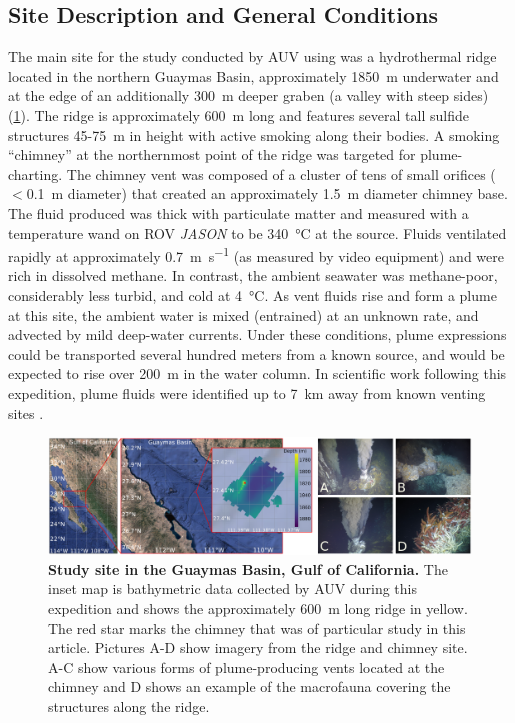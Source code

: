 \subsection{Site Description and General Conditions}
The main site for the study conducted by AUV \Sentry using \PHORTEX was a hydrothermal ridge located in the northern Guaymas Basin, approximately \SI{1850}{\meter} underwater and at the edge of an additionally \SI{300}{\meter} deeper graben (a valley with steep sides) (\cref{fig:site}). The ridge is approximately \SI{600}{\meter} long and features several tall sulfide structures 45-\SI{75}{\meter} in height with active smoking along their bodies. A smoking ``chimney'' at the northernmost point of the ridge was targeted for plume-charting. The chimney vent was composed of a cluster of tens of small orifices ($<$\SI{0.1}{\meter} diameter) that created an approximately \SI{1.5}{\meter} diameter chimney base. The fluid produced was thick with particulate matter and measured with a temperature wand on ROV \emph{JASON} to be \SI{340}{\celsius} at the source. Fluids ventilated rapidly at approximately \SI{0.7}{\meter\per\second} (as measured by video equipment) and were rich in dissolved methane. In contrast, the ambient seawater was methane-poor, considerably less turbid, and cold at \SI{4}{\celsius}. As vent fluids rise and form a plume at this site, the ambient water is mixed (entrained) at an unknown rate, and advected by mild deep-water currents. Under these conditions, plume expressions could be transported several hundred meters from a known source, and would be expected to rise over \SI{200}{\meter} in the water column. In scientific work following this expedition, plume fluids were identified up to \SI{7}{\kilo\meter} away from known venting sites \autocite{preston2022discovering}. 

\begin{figure}[h!]
    \centering
    \includegraphics[width=\columnwidth]{figures/site_summary.png}
    \caption{\textbf{Study site in the Guaymas Basin, Gulf of California.} The inset map is bathymetric data collected by AUV \Sentry during this expedition and shows the approximately \SI{600}{\meter} long ridge in yellow. The red star marks the chimney that was of particular study in this article. Pictures A-D show imagery from the ridge and chimney site. A-C show various forms of plume-producing vents located at the chimney and D shows an example of the macrofauna covering the structures along the ridge.}
    \label{fig:site}
\end{figure}

